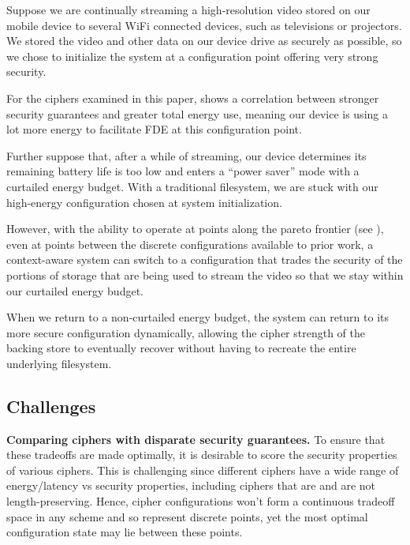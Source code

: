 Suppose we are continually streaming a high-resolution video stored on our
mobile device to several WiFi connected devices, such as televisions or
projectors. We stored the video and other data on our device drive as securely
as possible, so we chose to initialize the system at a configuration point
offering very strong security.

For the ciphers examined in this paper,  shows
a correlation between stronger security guarantees and greater total energy
use, meaning our device is using a lot more energy to facilitate FDE at this
configuration point.

Further suppose that, after a while of streaming, our device determines its
remaining battery life is too low and enters a ``power saver'' mode with a
curtailed energy budget. With a traditional filesystem, we are stuck with our
high-energy configuration chosen at system initialization.

However, with the ability to operate at points along the pareto frontier (see
), even at points between the discrete configurations
available to prior work, a context-aware system can switch to a configuration
that trades the security of the portions of storage that are being used to
stream the video so that we stay within our curtailed energy budget.

When we return to a non-curtailed energy budget, the system can return to its
more secure configuration dynamically, allowing the cipher strength of the
backing store to eventually recover without having to recreate the entire
underlying filesystem.

\subsection{Challenges}

\textbf{Comparing ciphers with disparate security guarantees.} To ensure that
these tradeoffs are made optimally, it is desirable to score the security
properties of various ciphers. This is challenging since different ciphers have
a wide range of energy/latency vs security properties, including ciphers that
are and are not length-preserving. Hence, cipher configurations won't form a
continuous tradeoff space in any scheme and so represent discrete points, yet
the most optimal configuration state may lie between these points.

